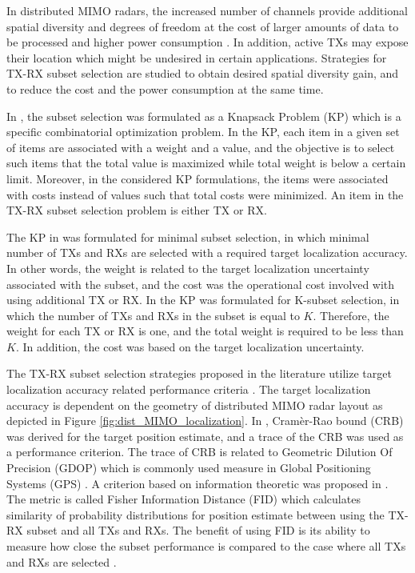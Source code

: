 \documentclass[english, 12pt, a4paper, elec, utf8, a-1b, online]{aaltothesis}
\begin{document}
In distributed MIMO radars, the increased number of channels provide additional spatial diversity and degrees of freedom at the cost of larger amounts of data to be processed and higher power consumption \cite{Haimovich2008}.
In addition, active TXs may expose their location which might be undesired in certain applications.
Strategies for TX-RX subset selection are studied to obtain desired spatial diversity gain, and to reduce the cost and the power consumption at the same time.

In \cite{Godrich2011a, Godrich2011}, the subset selection was formulated as a Knapsack
Problem (KP) which is a specific combinatorial optimization problem.
In the KP, each item in a given set of items are associated with a weight and a value, and the objective is to select such items that the total value is maximized while total weight is below a certain limit.
Moreover, in the considered KP formulations, the items were associated with costs instead of values such that total costs were minimized.
An item in the TX-RX subset selection problem is either TX or RX.

The KP in \cite{Godrich2011a} was formulated for minimal subset selection, in which minimal number of TXs and RXs are selected with a required target localization accuracy.
In other words, the weight is related to the target localization uncertainty associated with the subset, and the cost was the operational cost involved with using additional TX or RX.
In \cite{Godrich2011} the KP was formulated for K-subset selection, in which the number of TXs and RXs in the subset is equal to $K$.
Therefore, the weight for each TX or RX is one, and the total weight is required to be less than $K$.
In addition, the cost was based on the target localization uncertainty.

The TX-RX subset selection strategies proposed in the literature utilize target localization accuracy related performance criteria \cite{Godrich2011a, Godrich2011, Sun2014}.
The target localization accuracy is dependent on the geometry of distributed MIMO radar layout as depicted in Figure \ref{fig:dist_MIMO_localization}.
In \cite{Godrich2011a, Godrich2011}, Cram\`er-Rao bound (CRB) was derived for the target position estimate, and a trace of the CRB was used as a performance criterion.
The trace of CRB is related to Geometric Dilution Of Precision (GDOP) which is commonly used measure in Global Positioning Systems (GPS) \cite{Sun2014}. 
A criterion based on information theoretic was proposed in \cite{Sun2014}.
The metric is called Fisher Information Distance (FID) which calculates similarity of probability distributions for position estimate between using the TX-RX subset and all TXs and RXs.
The benefit of using FID is its ability to measure how close the subset performance is compared to the case where all TXs and RXs are selected \cite{Sun2014}.
\end{document}
